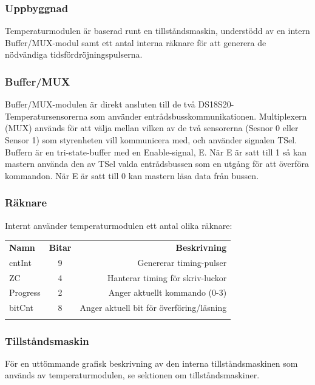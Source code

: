 \documentclass[a4paper,11pt]{article}
\begin{document}
	\subsubsection{Uppbyggnad}

	Temperaturmodulen är baserad runt en tillståndsmaskin, understödd av en intern Buffer/MUX-modul samt 
	ett antal interna räknare för att generera de nödvändiga tidsfördröjningspulserna.

	\subsubsection{Buffer/MUX}

	Buffer/MUX-modulen är direkt ansluten till de två DS18S20-Temperatursensorerna som använder entrådsbusskommunikationen.
	Multiplexern (MUX) används för att välja mellan vilken av de två sensorerna (Sesnor 0 eller Sensor 1) som styrenheten
	vill kommunicera med, och använder signalen TSel.
	Buffern är en tri-state-buffer med en Enable-signal, E. När E är satt till 1 så kan mastern använda den av TSel valda
	entrådsbussen som en utgång för att överföra kommandon. När E är satt till 0 kan mastern läsa data från bussen.

	\subsubsection{Räknare}

	Internt använder temperaturmodulen ett antal olika räknare: \\
		\begin{tabular}{l c r}
			\\{\bf Namn} & {\bf Bitar} & {\bf Beskrivning}\\
			cntInt & 9 & Genererar timing-pulser\\
			ZC & 4 & Hanterar timing för skriv-luckor\\
			Progress & 2 & Anger aktuellt kommando (0-3)\\
			bitCnt & 8 & Anger aktuell bit för överföring/läsning\\\\
		\end{tabular}

	\subsubsection{Tillståndsmaskin}

	För en uttömmande grafisk beskrivning av den interna tillståndsmaskinen som används av temperaturmodulen,
	se sektionen om tillståndsmaskiner.
\end{document}
